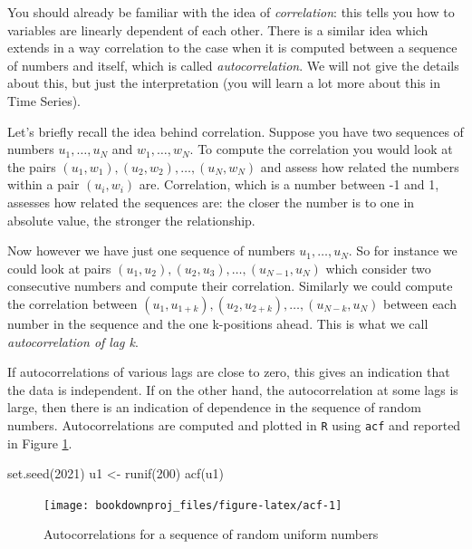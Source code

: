 \documentclass[
]{book}
\newenvironment{Shaded}{\begin{snugshade}}{\end{snugshade}}
\newcommand{\DecValTok}[1]{\textcolor[rgb]{0.00,0.00,0.81}{#1}}
\newcommand{\FunctionTok}[1]{\textcolor[rgb]{0.00,0.00,0.00}{#1}}
\newcommand{\NormalTok}[1]{#1}
\newcommand{\OtherTok}[1]{\textcolor[rgb]{0.56,0.35,0.01}{#1}}
\begin{document}
You should already be familiar with the idea of \emph{correlation}: this tells you how to variables are linearly dependent of each other. There is a similar idea which extends in a way correlation to the case when it is computed between a sequence of numbers and itself, which is called \emph{autocorrelation}. We will not give the details about this, but just the interpretation (you will learn a lot more about this in Time Series).

Let's briefly recall the idea behind correlation. Suppose you have two sequences of numbers \(u_1,\dots,u_N\) and \(w_1,\dots,w_N\). To compute the correlation you would look at the pairs \((u_1,w_1),(u_2,w_2),\dots, (u_N,w_N)\) and assess how related the numbers within a pair \((u_i,w_i)\) are. Correlation, which is a number between -1 and 1, assesses how related the sequences are: the closer the number is to one in absolute value, the stronger the relationship.

Now however we have just one sequence of numbers \(u_1,\dots,u_N\). So for instance we could look at pairs \((u_1,u_2), (u_2,u_3), \dots, (u_{N-1},u_{N})\) which consider two consecutive numbers and compute their correlation. Similarly we could compute the correlation between \((u_1,u_{1+k}), (u_2,u_{2+k}),\dots, (u_{N-k},u_N)\) between each number in the sequence and the one k-positions ahead. This is what we call \emph{autocorrelation of lag k}.

If autocorrelations of various lags are close to zero, this gives an indication that the data is independent. If on the other hand, the autocorrelation at some lags is large, then there is an indication of dependence in the sequence of random numbers. Autocorrelations are computed and plotted in \texttt{R} using \texttt{acf} and reported in Figure \ref{fig:acf}.

\begin{Shaded}
\begin{Highlighting}[]
\FunctionTok{set.seed}\NormalTok{(}\DecValTok{2021}\NormalTok{)}
\NormalTok{u1 }\OtherTok{\textless{}{-}} \FunctionTok{runif}\NormalTok{(}\DecValTok{200}\NormalTok{)}
\FunctionTok{acf}\NormalTok{(u1)}
\end{Highlighting}
\end{Shaded}

\begin{figure}

{\centering \texttt{[image: bookdownproj\_files/figure-latex/acf-1]} 

}

\caption{Autocorrelations for a sequence of random uniform numbers}\label{fig:acf}
\end{figure}
\end{document}
